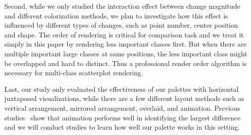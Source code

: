 Second, while we only studied the interaction effect between change magnitude and different colorization methods, we plan to investigate how this effect is influenced by different types of changes, such as point number, center position and shape.
The order of rendering is critical for comparison task and we treat it simply in this paper by rendering less important classes first. But when there are multiple important large classes at same positions, the less important class might be overlapped and hard to distinct. Thus a professional render order algorithm is necessary for multi-class scatterplot rendering.

Last, our study only evaluated the effectiveness of our palettes with horizontal juxtaposed visualizations, while there are a few different layout methods such as vertical arrangement, mirrored arrangement, overlaid, and animation. Previous studies~\cite{Ondov19} show that animation performs well in identifying the largest difference and we will conduct studies to learn how well our palette works in this setting.




